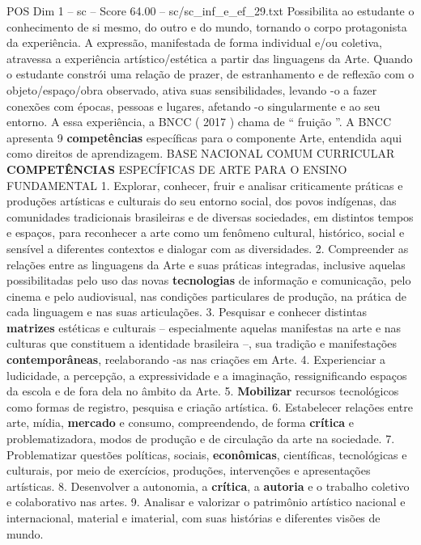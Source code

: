 \begin{textsample}{POS Dim 1 – sc – Score 64.00 – sc/sc\_inf\_e\_ef\_29.txt}
Possibilita ao estudante o conhecimento de si mesmo, do outro e do mundo, tornando o corpo protagonista da experiência.
A expressão, manifestada de forma individual e/ou coletiva, atravessa a experiência artístico/estética a partir das linguagens da Arte.
Quando o estudante constrói uma relação de prazer, de estranhamento e de reflexão com o objeto/espaço/obra observado, ativa suas sensibilidades, levando -o a fazer conexões com épocas, pessoas e lugares, afetando -o singularmente e ao seu entorno.
A essa experiência, a BNCC ( 2017 ) chama de “ fruição ”.
A BNCC apresenta 9 \textbf{competências} específicas para o componente Arte, entendida aqui como direitos de aprendizagem.
BASE NACIONAL COMUM CURRICULAR \textbf{COMPETÊNCIAS} ESPECÍFICAS DE ARTE PARA O ENSINO FUNDAMENTAL 1.
Explorar, conhecer, fruir e analisar criticamente práticas e produções artísticas e culturais do seu entorno social, dos povos indígenas, das comunidades tradicionais brasileiras e de diversas sociedades, em distintos tempos e espaços, para reconhecer a arte como um fenômeno cultural, histórico, social e sensível a diferentes contextos e dialogar com as diversidades. 2.
Compreender as relações entre as linguagens da Arte e suas práticas integradas, inclusive aquelas possibilitadas pelo uso das novas \textbf{tecnologias} de informação e comunicação, pelo cinema e pelo audiovisual, nas condições particulares de produção, na prática de cada linguagem e nas suas articulações. 3.
Pesquisar e conhecer distintas \textbf{matrizes} estéticas e culturais – especialmente aquelas manifestas na arte e nas culturas que constituem a identidade brasileira –, sua tradição e manifestações \textbf{contemporâneas}, reelaborando -as nas criações em Arte. 4.
Experienciar a ludicidade, a percepção, a expressividade e a imaginação, ressignificando espaços da escola e de fora dela no âmbito da Arte. 5. \textbf{Mobilizar} recursos tecnológicos como formas de registro, pesquisa e criação artística. 6.
Estabelecer relações entre arte, mídia, \textbf{mercado} e consumo, compreendendo, de forma \textbf{crítica} e problematizadora, modos de produção e de circulação da arte na sociedade. 7.
Problematizar questões políticas, sociais, \textbf{econômicas}, científicas, tecnológicas e culturais, por meio de exercícios, produções, intervenções e apresentações artísticas. 8.
Desenvolver a autonomia, a \textbf{crítica}, a \textbf{autoria} e o trabalho coletivo e colaborativo nas artes. 9.
Analisar e valorizar o patrimônio artístico nacional e internacional, material e imaterial, com suas histórias e diferentes visões de mundo.

\end{textsample}
